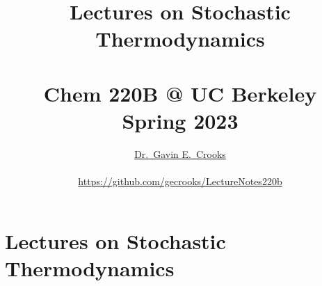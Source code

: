 \documentclass[article,notes]{bespoke6}
\newcommand{\thetitle}{Lectures on Stochastic Thermodynamics}
\newcommand{\theauthor}{Dr.\ Gavin E.\ Crooks}
\newcommand{\self}{_disorder}			%
\begin{document}

\nocite{}


\title{\color{\titlecolor}\thetitle \\ ~  \\ Chem 220B @ UC Berkeley \\ Spring 2023 }
\author{\href{http://threeplusone.com/}{\theauthor}\\~\\ \url{https://github.com/gecrooks/LectureNotes220b}}
\date{}
\maketitle
\thispagestyle{empty}

\tableofcontents
\clearpage
\section{Lectures on Stochastic Thermodynamics}
\end{document}
